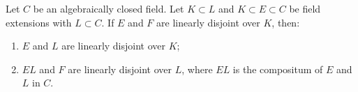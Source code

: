 Let $C$ be an algebraically closed field. Let $K \subset L$ and $K \subset E \subset C$ be field extensions with $L \subset C$.
If $E$ and $F$ are linearly disjoint over $K$, then:
\begin{enumerate}
\item[(i)] $E$ and $L$ are linearly disjoint over $K$;
\item[(ii)] $EL$ and $F$ are linearly disjoint over $L$, where $EL$ is the compositum of $E$ and $L$ in $C$.
\end{enumerate}
